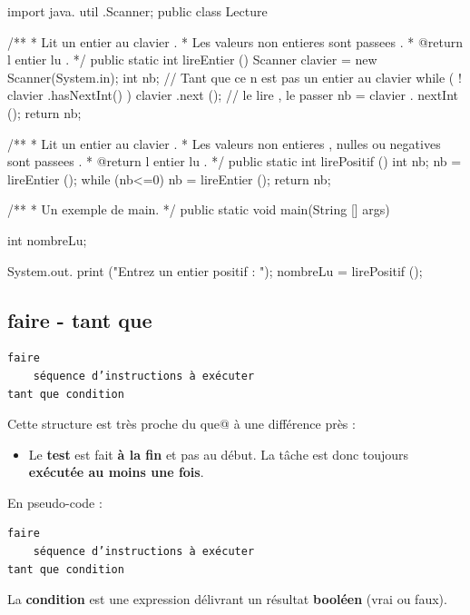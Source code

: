 \documentclass[11pt,a4paper]{article}
\begin{document}
            \par
        \begin{Java}
import java. util .Scanner;
public class Lecture {
    /**
    * Lit un entier au clavier .
    * Les valeurs non entieres sont passees .
    * @return l entier lu .
    */
    public static int lireEntier () {
      Scanner clavier = new Scanner(System.in);
      int nb;
      // Tant que ce n  est pas un entier au clavier
      while ( ! clavier .hasNextInt() ) {
        clavier .next (); // le lire , le passer
      }
      nb = clavier . nextInt ();
      return nb;
    }

    /**
    * Lit un entier au clavier .
    * Les valeurs non entieres , nulles ou negatives sont passees .
    * @return l entier lu .
    */
    public static int lirePositif () {
      int nb;
      nb = lireEntier ();
      while (nb<=0) {
        nb = lireEntier ();
      }
      return nb;
    }

    /**
    * Un exemple de main.
    */
    public static void main(String [] args){
      int nombreLu;
      
      System.out. print ("Entrez un entier  positif : ");
      nombreLu = lirePositif ();
    }
}\end{Java}\subsection{faire - tant que}\begin{verbatim}
faire
    séquence d’instructions à exécuter
tant que condition
      \end{verbatim}
        Cette structure est tr\`es proche du \guillemotleft  \verb@tant que@ \guillemotright  \`a une diff\'erence pr\`es :
        
					\begin{itemize}
				
			\item 
            Le \textbf{test} est fait \textbf{\`a la fin} et pas au d\'ebut. 
            La t\^ache est donc toujours \textbf{ex\'ecut\'ee au moins une fois}.
          
					\end{itemize}
				
            \par
        En pseudo-code :
            \par
        \begin{verbatim}
faire
    séquence d’instructions à exécuter
tant que condition
      \end{verbatim}
        La \textbf{condition} est une expression d\'elivrant un r\'esultat 
        \textbf{bool\'een} (vrai ou faux).
      
\end{document}
